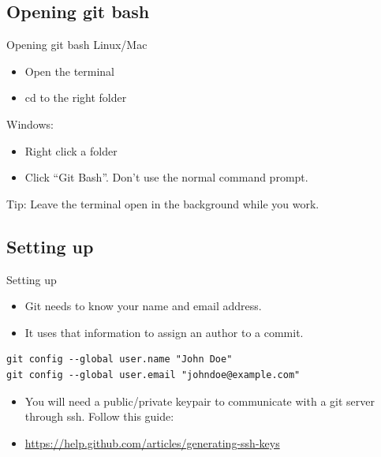 \documentclass[10pt,a4paper]{beamer}
\begin{document}
\subsection{Opening git bash}
\begin{frame}{Opening git bash}
Linux/Mac
\begin{itemize}
\item Open the terminal
\item cd to the right folder
\end{itemize}

Windows:
\begin{itemize}
\item Right click a folder
\item Click ``Git Bash''. Don't use the normal command prompt.
\end{itemize}

Tip: Leave the terminal open in the background while you work.


\end{frame}

\subsection{Setting up}
\begin{frame}[fragile]{Setting up}
\begin{itemize}
\item Git needs to know your name and email address.
\item It uses that information to assign an author to a commit.
\end{itemize}

\begin{verbatim}
git config --global user.name "John Doe"
git config --global user.email "johndoe@example.com"
\end{verbatim}

\begin{itemize}
\item You will need a public/private keypair to communicate with a git server through ssh. Follow this guide:
\item \href{https://help.github.com/articles/generating-ssh-keys}{\color{blue}https://help.github.com/articles/generating-ssh-keys}
\end{itemize}
\end{frame}
\end{document}
